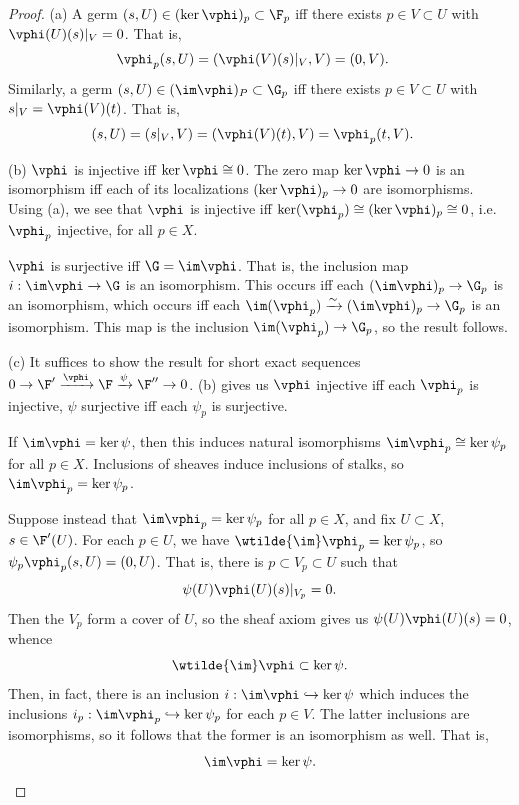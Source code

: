 \documentclass[12pt]{amsart}
\begin{document}
\begin{proof}
  (a) A germ $(s,U)\in (\ker\vphi)_p\subset \F_p$ iff there exists $p\in V\subset U$ with $\vphi(U)(s)|_V = 0$. That is, 
  \begin{align*}
    \vphi_p(s,U) &= (\vphi(V)(s)|_V,V)=(0,V).
  \end{align*}
  Similarly, a germ $(s,U)\in (\im\vphi)_P\subset \G_p$ iff there exists $p\in V\subset U$ with $s|_V= \vphi(V)(t)$. That is,
  \begin{align*}
    (s,U) &= (s|_V,V) = (\vphi(V)(t),V) 
    = \vphi_p(t,V).
  \end{align*}

  (b) $\vphi$ is injective iff $\ker\vphi\cong 0$. The zero map $\ker\vphi\to 0$ is an isomorphism iff each of its localizations $(\ker\vphi)_p\to 0$ are isomorphisms. Using (a), we see that $\vphi$ is injective iff $\ker(\vphi_p)\cong (\ker\vphi)_p\cong 0$, i.e. $\vphi_p$ injective, for all $p\in X$.

  $\vphi$ is surjective iff $\G = \im\vphi$. That is, the inclusion map $i:\im\vphi\to \G$ is an isomorphism.
  This occurs iff each $(\im\vphi)_p\to \G_p$ is an isomorphism, which occurs iff each $\im(\vphi_p)\xrightarrow{\sim} (\im\vphi)_p\to \G_p$ is an isomorphism. 
  This map is the inclusion $\im(\vphi_p)\to \G_p$, so the result follows.

  (c) It suffices to show the result for short exact sequences $0\to \F'\xrightarrow{\vphi}\F\xrightarrow{\psi}\F''\to 0$.
  (b) gives us $\vphi$ injective iff each $\vphi_p$ is injective, $\psi$ surjective iff each $\psi_p$ is surjective. 

  If $\im\vphi=\ker\psi$, then this induces natural isomorphisms $\im\vphi_p\cong\ker\psi_p$ for all $p\in X$.
  Inclusions of sheaves induce inclusions of stalks, so $\im\vphi_p=\ker\psi_p$.

  Suppose instead that $\im\vphi_p=\ker\psi_p$ for all $p\in X$, and fix $U\subset X$, $s\in \F'(U)$.
  For each $p\in U$, we have $\wtilde{\im}\vphi_p= \ker\psi_p$, so $\psi_p\vphi_p(s,U)=(0,U)$.
  That is, there is $p\subset V_p\subset U$ such that 
  \[
    \psi(U)\vphi(U)(s)|_{V_p} =0.
  \]
  Then the $V_p$ form a cover of $U$, so the sheaf axiom gives us $\psi(U)\vphi(U)(s)=0$, whence
  \[
    \wtilde{\im}\vphi\subset \ker\psi.
  \] 
  Then, in fact, there is an inclusion $i:\im\vphi\hookrightarrow \ker\psi$ which induces the inclusions $i_p:\im\vphi_p\hookrightarrow\ker\psi_p$ for each $p\in V$.
  The latter inclusions are isomorphisms, so it follows that the former is an isomorphism as well.
  That is,
  \[
    \im\vphi=\ker\psi.
  \] 
\end{proof}
\end{document}
